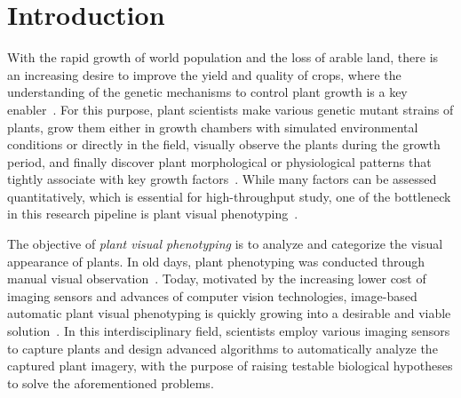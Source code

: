 \section{Introduction}
\label{sec:intro}

With the rapid growth of world population  and the loss of arable land, there is an increasing desire to improve the yield and quality of crops, where the understanding of the genetic mechanisms to control plant growth is a key enabler~\cite{doos2002population}.
%
For this purpose, plant scientists make various genetic mutant strains of plants, grow them either in  growth chambers with simulated environmental conditions or directly in the field, visually observe the plants during the growth period, and finally discover plant morphological or physiological patterns that tightly associate with key growth factors~\cite{houle2010phenomics}.
%
While many factors can be assessed quantitatively, which is essential for high-throughput study, one of the bottleneck in this research pipeline is plant visual phenotyping~\cite{walter2015plant}.

The objective of {\it plant visual phenotyping} is to analyze and categorize the visual appearance of plants. %
In old days, plant phenotyping was conducted through manual visual observation~\cite{Erblichkeit1903}. 
Today, motivated by the increasing lower cost of imaging sensors and advances of computer vision technologies, image-based automatic plant visual phenotyping is quickly growing into a desirable and viable solution~\cite{cruz2015depi}. 
In this interdisciplinary field, scientists employ various imaging sensors to capture plants and design advanced algorithms to automatically analyze the captured plant imagery, with the purpose of raising testable biological hypotheses to solve the aforementioned problems.

